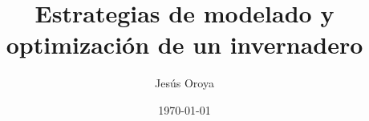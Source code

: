 \documentclass{book}
\title{Estrategias de modelado y optimización de un invernadero}
\author{Jesús Oroya}
\date{\today }
\begin{document}
\maketitle
\tableofcontents






\chapter*{}

 
\end{document}

